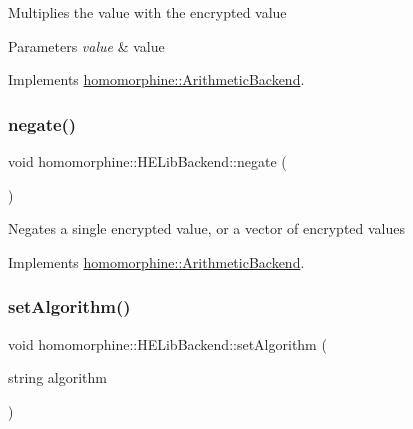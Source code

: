 Multiplies the value with the encrypted value


\begin{DoxyParams}{Parameters}
{\em value} & value \\
\hline
\end{DoxyParams}


Implements \mbox{\hyperlink{classhomomorphine_1_1_arithmetic_backend_a22f4c598c5a3987ef6efe5925f4c5b81}{homomorphine\+::\+Arithmetic\+Backend}}.

\mbox{\label{classhomomorphine_1_1_h_e_lib_backend_acb1ed456fa91fc1dfe878abb068f3f34}} 
\subsubsection{\texorpdfstring{negate()}{negate()}}
{\footnotesize\ttfamily void homomorphine\+::\+H\+E\+Lib\+Backend\+::negate (\begin{DoxyParamCaption}{ }\end{DoxyParamCaption})\hspace{0.3cm}{\ttfamily [virtual]}}

Negates a single encrypted value, or a vector of encrypted values 

Implements \mbox{\hyperlink{classhomomorphine_1_1_arithmetic_backend_ad27913060534c42b5812a1e4cf21475f}{homomorphine\+::\+Arithmetic\+Backend}}.

\mbox{\label{classhomomorphine_1_1_h_e_lib_backend_a39478377b0e299fd90f5c7bb6c8efe89}} 
\subsubsection{\texorpdfstring{setAlgorithm()}{setAlgorithm()}}
{\footnotesize\ttfamily void homomorphine\+::\+H\+E\+Lib\+Backend\+::set\+Algorithm (\begin{DoxyParamCaption}\item[{string}]{algorithm }\end{DoxyParamCaption})\hspace{0.3cm}{\ttfamily [virtual]}}

